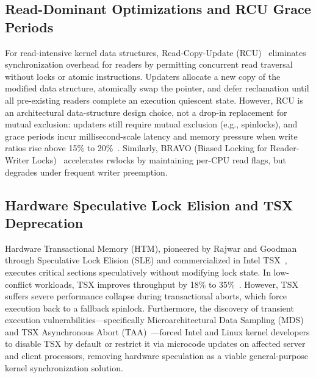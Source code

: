 \documentclass[conference]{IEEEtran}
\begin{document}
\subsection{Read-Dominant Optimizations and RCU Grace Periods}
For read-intensive kernel data structures, Read-Copy-Update (RCU)~\cite{mckenney2021parallel,mckenney2020rcu} eliminates synchronization overhead for readers by permitting concurrent read traversal without locks or atomic instructions. Updaters allocate a new copy of the modified data structure, atomically swap the pointer, and defer reclamation until all pre-existing readers complete an execution quiescent state. However, RCU is an architectural data-structure design choice, not a drop-in replacement for mutual exclusion: updaters still require mutual exclusion (e.g., spinlocks), and grace periods incur millisecond-scale latency and memory pressure when write ratios rise above 15\% to 20\%~\cite{mckenney2021parallel,mckenney2020rcu}. Similarly, BRAVO (Biased Locking for Reader-Writer Locks)~\cite{dice2019bravo} accelerates rwlocks by maintaining per-CPU read flags, but degrades under frequent writer preemption.

\subsection{Hardware Speculative Lock Elision and TSX Deprecation}
Hardware Transactional Memory (HTM), pioneered by Rajwar and Goodman~\cite{rajwar2001speculative} through Speculative Lock Elision (SLE) and commercialized in Intel TSX~\cite{yoo2013performance}, executes critical sections speculatively without modifying lock state. In low-conflict workloads, TSX improves throughput by 18\% to 35\%~\cite{yoo2013performance}. However, TSX suffers severe performance collapse during transactional aborts, which force execution back to a fallback spinlock. Furthermore, the discovery of transient execution vulnerabilities---specifically Microarchitectural Data Sampling (MDS) and TSX Asynchronous Abort (TAA)~\cite{intel2019mds,intel2019sa}---forced Intel and Linux kernel developers to disable TSX by default or restrict it via microcode updates on affected server and client processors, removing hardware speculation as a viable general-purpose kernel synchronization solution.
\end{document}
